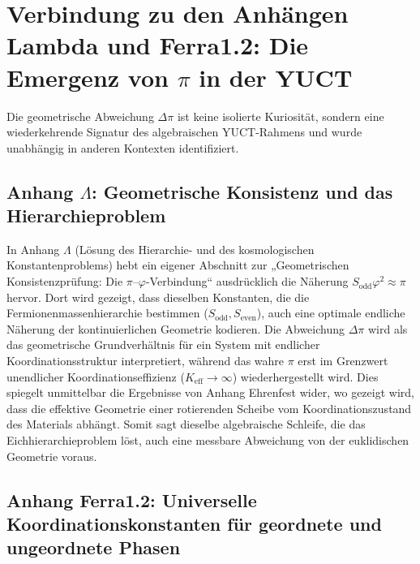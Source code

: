 \documentclass[12pt,a4paper]{article}
\begin{document}
	\section{Verbindung zu den Anhängen Lambda und Ferra1.2: Die Emergenz von \(\pi\) in der YUCT}
	
	Die geometrische Abweichung \(\Delta\pi\) ist keine isolierte Kuriosität, sondern eine wiederkehrende Signatur des algebraischen YUCT-Rahmens und wurde unabhängig in anderen Kontexten identifiziert.
	
	\subsection{Anhang \(\Lambda\): Geometrische Konsistenz und das Hierarchieproblem}
	
	In Anhang \(\Lambda\) (Lösung des Hierarchie- und des kosmologischen Konstantenproblems) hebt ein eigener Abschnitt zur „Geometrischen Konsistenzprüfung: Die \(\pi\)–\(\varphi\)-Verbindung“ ausdrücklich die Näherung \(S_{\mathrm{odd}}\varphi^2 \approx \pi\) hervor. Dort wird gezeigt, dass dieselben Konstanten, die die Fermionenmassenhierarchie bestimmen (\(S_{\mathrm{odd}}, S_{\mathrm{even}}\)), auch eine optimale endliche Näherung der kontinuierlichen Geometrie kodieren. Die Abweichung \(\Delta\pi\) wird als das geometrische Grundverhältnis für ein System mit endlicher Koordinationsstruktur interpretiert, während das wahre \(\pi\) erst im Grenzwert unendlicher Koordinationseffizienz (\(K_{\mathrm{eff}} \to \infty\)) wiederhergestellt wird. Dies spiegelt unmittelbar die Ergebnisse von Anhang Ehrenfest wider, wo gezeigt wird, dass die effektive Geometrie einer rotierenden Scheibe vom Koordinationszustand des Materials abhängt. Somit sagt dieselbe algebraische Schleife, die das Eichhierarchieproblem löst, auch eine messbare Abweichung von der euklidischen Geometrie voraus.
	
	\subsection{Anhang Ferra1.2: Universelle Koordinationskonstanten für geordnete und ungeordnete Phasen}
	
\end{document}
